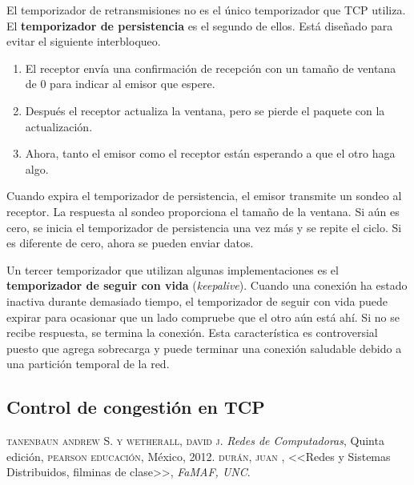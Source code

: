 \documentclass[10pt,a4paper]{report}
\begin{document}
	\par El temporizador de retransmisiones no es el único temporizador que TCP utiliza. El \textbf{temporizador de persistencia} es el segundo de ellos. Está diseñado para evitar el siguiente interbloqueo.
	\begin{enumerate}
		\item  El receptor envía una confirmación de recepción con un tamaño de ventana de 0 para indicar al emisor que espere.
		\item Después el receptor actualiza la ventana, pero se pierde el paquete con la actualización.
		\item Ahora, tanto el emisor como el receptor están esperando a que el otro haga algo.
	\end{enumerate}	
	
	\par Cuando expira el temporizador de persistencia, el emisor transmite un sondeo al receptor. La respuesta al sondeo proporciona el tamaño de la ventana. Si aún es cero, se inicia el temporizador de persistencia una vez más y se repite el ciclo. Si es diferente de cero, ahora se pueden enviar datos.

	\par Un tercer temporizador que utilizan algunas implementaciones es el \textbf{temporizador de seguir con vida} (\textit{keepalive}). Cuando una conexión ha estado inactiva durante demasiado tiempo, el temporizador de seguir con vida puede expirar para ocasionar que un lado compruebe que el otro aún está ahí. Si no se recibe respuesta, se termina la conexión. Esta característica es controversial puesto que agrega sobrecarga y puede terminar una conexión saludable debido a una partición temporal de la red.

\subsection{Control de congestión en TCP}



\begin{thebibliography}{X}
 \textsc{tanenbaun andrew S. y wetherall, david j.}
\textit{Redes de Computadoras}, Quinta edición,
\textsc{pearson educación}, México, 2012.
 \textsc{durán, juan },
<<Redes y Sistemas Distribuidos, filminas de clase>>,
\textit{FaMAF, UNC}.
\end{thebibliography}
\end{document}
